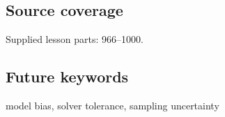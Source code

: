 \subsection{Source coverage}\label{appendix-31b8c295e05f-source-coverage}

Supplied lesson parts: 966--1000.

\subsection{Future keywords}\label{appendix-31b8c295e05f-future-keywords}

model bias, solver tolerance, sampling uncertainty
